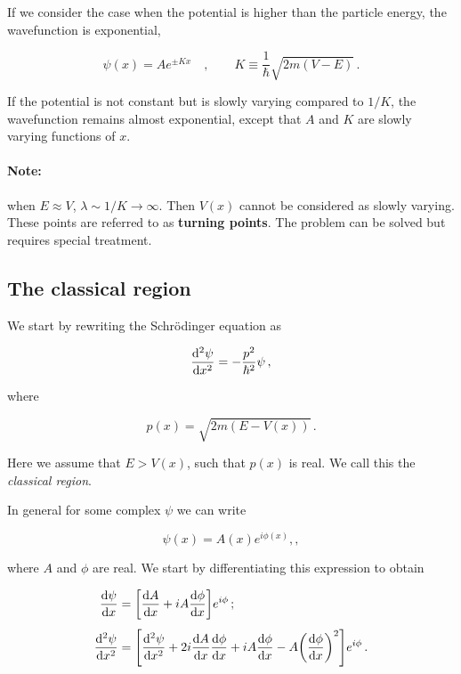 \documentclass[12pt, titlepage]{article}
\begin{document}
If we consider the case when the potential is higher than the particle energy, the wavefunction is exponential,

\begin{equation}
	\psi(x) = Ae^{\pm Kx} \quad, \qquad K \equiv \frac{1}{\hbar}\sqrt{2m(V-E)} \,.
\end{equation}

If the potential is not constant but is slowly varying compared to $1/K$, the wavefunction remains almost exponential, except that $A$ and $K$ are slowly varying functions of $x$.

\begin{mdframed}
	\paragraph*{Note:} when $E \approx V$, $\lambda\sim 1/K \rightarrow\infty$. Then $V(x)$ cannot be considered as slowly varying. These points are referred to as \textbf{turning points}. The problem can be solved but requires special treatment.
\end{mdframed}

\subsection{The classical region}
We start by rewriting the Schrödinger equation as

\begin{equation}
	\dv[2]{\psi}{x} = -\frac{p^2}{\hbar^2}\psi \,,
\end{equation} 

where

\begin{equation}
	p(x) = \sqrt{2m(E-V(x))} \,.
\end{equation}

Here we assume that $E>V(x)$, such that $p(x)$ is real. We call this the \textit{classical region}.

In general for some complex $\psi$ we can write

\begin{equation}
	\psi(x) = A(x)e^{i\phi(x)} ,,
\end{equation}

where $A$ and $\phi$ are real. We start by differentiating this expression to obtain

\begin{align}
	\dv{\psi}{x} &= \qty[\dv{A}{x} + iA\dv{\phi}{x}]e^{i\phi}\,; \\[4pt]
	\dv[2]{\psi}{x} &= \qty[\dv[2]{\psi}{x} + 2i\dv{A}{x}\dv{\phi}{x} + iA\dv{\phi}{x} - A\qty(\dv{\phi}{x})^2]e^{i\phi} \,.
\end{align}
\end{document}
